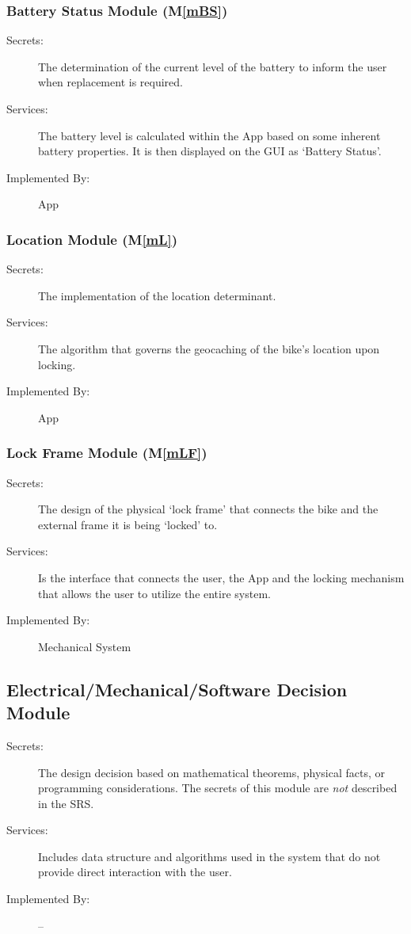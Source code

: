 \documentclass[12pt, titlepage]{article}
\newcommand{\mref}[1]{M\ref{#1}}
\begin{document}
\subsubsection{Battery Status Module (\mref{mBS})}
\begin{description}
\item[Secrets:]The determination of the current level of the battery to inform the user when replacement is required.
\item[Services:]The battery level is calculated within the App based on some inherent battery properties. It is then displayed on the GUI as ‘Battery Status’. 
\item[Implemented By:]App
\end{description}

\subsubsection{Location Module (\mref{mL})}
\begin{description}
\item[Secrets:]The implementation of the location determinant.
\item[Services:]The algorithm that governs the geocaching of the bike’s location upon locking.
\item[Implemented By:]App
\end{description}

\subsubsection{Lock Frame Module (\mref{mLF})}
\begin{description}
\item[Secrets:]The design of the physical ‘lock frame’ that connects the bike and the external frame it is being ‘locked’ to.
\item[Services:]Is the interface that connects the user, the App and the locking mechanism that allows the user to utilize the entire system.
\item[Implemented By:]Mechanical System
\end{description}

\subsection{Electrical/Mechanical/Software Decision Module}

\begin{description}
\item[Secrets:] The design decision based on mathematical theorems, physical
  facts, or programming considerations. The secrets of this module are
  \emph{not} described in the SRS.
\item[Services:] Includes data structure and algorithms used in the system that
  do not provide direct interaction with the user. 
\item[Implemented By:] --
\end{description}
\end{document}
